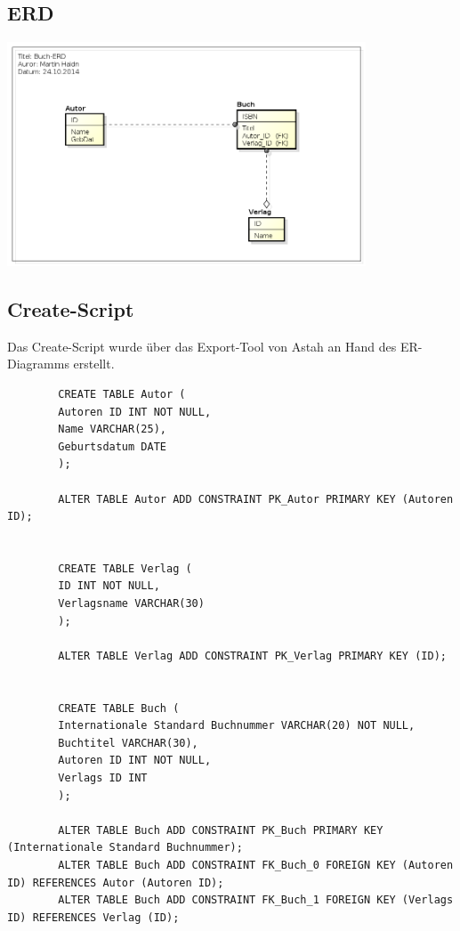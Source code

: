 \documentclass[a4paper]{article}
\begin{document}
	\subsection{ERD}
	\begin{center}
		\includegraphics[width=0.8\textwidth]{img/buch-erd.png}
	\end{center}
	
	\subsection{Create-Script}
	Das Create-Script wurde über das Export-Tool von Astah an Hand des ER-Diagramms erstellt.\\
	\begin{tiny}
		\begin{lstlisting}
		CREATE TABLE Autor (
		Autoren ID INT NOT NULL,
		Name VARCHAR(25),
		Geburtsdatum DATE
		);
		
		ALTER TABLE Autor ADD CONSTRAINT PK_Autor PRIMARY KEY (Autoren ID);
		
		
		CREATE TABLE Verlag (
		ID INT NOT NULL,
		Verlagsname VARCHAR(30)
		);
		
		ALTER TABLE Verlag ADD CONSTRAINT PK_Verlag PRIMARY KEY (ID);
		
		
		CREATE TABLE Buch (
		Internationale Standard Buchnummer VARCHAR(20) NOT NULL,
		Buchtitel VARCHAR(30),
		Autoren ID INT NOT NULL,
		Verlags ID INT
		);
		
		ALTER TABLE Buch ADD CONSTRAINT PK_Buch PRIMARY KEY (Internationale Standard Buchnummer);
		ALTER TABLE Buch ADD CONSTRAINT FK_Buch_0 FOREIGN KEY (Autoren ID) REFERENCES Autor (Autoren ID);
		ALTER TABLE Buch ADD CONSTRAINT FK_Buch_1 FOREIGN KEY (Verlags ID) REFERENCES Verlag (ID);
		
		\end{lstlisting}
	\end{tiny}
	
\end{document}
